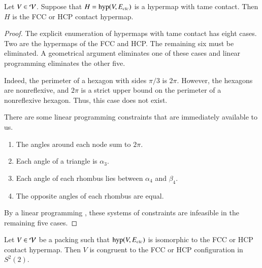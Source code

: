 \documentclass{llncs}
\def\op#1{{\hbox{#1}}}
\begin{document}
\begin{lemma}\label{lemma:fcc-ft} Let $V\in {\mathcal V}$.
  Suppose that $H=\op{hyp}(V,E_{ctc})$ is a hypermap with tame
  contact.  Then $H$ is the FCC or HCP contact hypermap.
\end{lemma}

\begin{proof} The explicit enumeration of hypermaps with tame
  contact has eight cases.  Two are the hypermaps of the
  FCC and HCP.  The remaining six must be eliminated.  
A geometrical argument  eliminates one of these cases and linear programming
eliminates the other five.

  Indeed, the perimeter of a hexagon with sides $\pi/3$
is $2\pi$.  However, the hexagons are nonreflexive, and $2\pi$ is a strict upper bound on the perimeter of a nonreflexive
hexagon.  Thus, this case does not exist.



There are some linear
  programming constraints that are immediately available to us.
\begin{enumerate}\wasitemize 
\item The angles around each node sum to $2\pi$.
\item Each angle of a triangle is $\alpha_3$.
\item Each angle of each rhombus lies between $\alpha_4$ and $\beta_4$.
\item The opposite angles of each rhombus are equal.
\end{enumerate}\wasitemize 
By a linear programming ,
these systems of constraints are infeasible in the remaining five cases.
\end{proof}


\begin{lemma}\label{lemma:kiss-fcc}
  Let $V\in {\mathcal V}$ be a packing such that $\op{hyp}(V,E_{ctc})$ is
  isomorphic to the FCC or HCP contact hypermap.  Then $V$ is
  congruent to the FCC or HCP configuration in $S^2(2)$.
\end{lemma}
%
%
%
%
%
\end{document}
